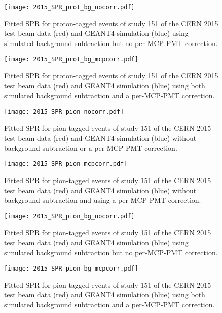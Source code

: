 \begin{figure}[!htb]
	\centering
	\texttt{[image: 2015\_SPR\_prot\_bg\_nocorr.pdf]}
	\caption{Fitted SPR for proton-tagged events of study 151 of the CERN 2015 test beam data (red) and GEANT4 simulation (blue) using simulated background subtraction but no per-MCP-PMT correction.}
	\label{fig:2015_SPR_prot_bg_nocorr}
\end{figure}

\begin{figure}[!htb]
	\centering
	\texttt{[image: 2015\_SPR\_prot\_bg\_mcpcorr.pdf]}
	\caption{Fitted SPR for proton-tagged events of study 151 of the CERN 2015 test beam data (red) and GEANT4 simulation (blue) using both simulated background subtraction and a per-MCP-PMT correction.}
	\label{fig:2015_SPR_prot_bg_mcpcorr}
\end{figure}

\begin{figure}[!htb]
	\centering
	\texttt{[image: 2015\_SPR\_pion\_nocorr.pdf]}
	\caption{Fitted SPR for pion-tagged events of study 151 of the CERN 2015 test beam data (red) and GEANT4 simulation (blue) without background subtraction or a per-MCP-PMT correction.}
	\label{fig:2015_SPR_pion_nocorr}
\end{figure}

\begin{figure}[!htb]
	\centering
	\texttt{[image: 2015\_SPR\_pion\_mcpcorr.pdf]}
	\caption{Fitted SPR for pion-tagged events of study 151 of the CERN 2015 test beam data (red) and GEANT4 simulation (blue) without background subtraction and using a per-MCP-PMT correction.}
	\label{fig:2015_SPR_pion_mcpcorr}
\end{figure}

\begin{figure}[!htb]
	\centering
	\texttt{[image: 2015\_SPR\_pion\_bg\_nocorr.pdf]}
	\caption{Fitted SPR for pion-tagged events of study 151 of the CERN 2015 test beam data (red) and GEANT4 simulation (blue) using simulated background subtraction but no per-MCP-PMT correction.}
	\label{fig:2015_SPR_pion_bg_nocorr}
\end{figure}

\begin{figure}[!htb]
	\centering
	\texttt{[image: 2015\_SPR\_pion\_bg\_mcpcorr.pdf]}
	\caption{Fitted SPR for pion-tagged events of study 151 of the CERN 2015 test beam data (red) and GEANT4 simulation (blue) using both simulated background subtraction and a per-MCP-PMT correction.}
	\label{fig:2015_SPR_pion_bg_mcpcorr}
\end{figure}

